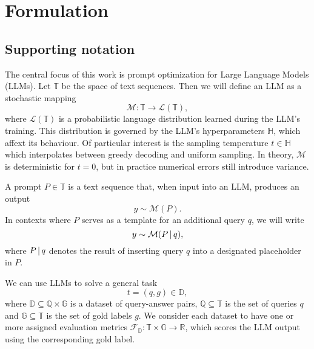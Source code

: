 \section{Formulation}\label{sec:notation}
\subsection{Supporting notation}
The central focus of this work is prompt optimization for Large Language Models (LLMs). 
Let $\mathbb{T}$ be the space of text sequences. Then we will define an LLM as a stochastic mapping
\begin{equation}
    \mathcal{M}: \mathbb{T} \rightarrow \mathcal{L}(\mathbb{T}),
\end{equation}
where $\mathcal{L}(\mathbb{T})$ is a probabilistic language distribution learned during the LLM's training.
This distribution is governed by the LLM's hyperparameters $\mathbb{H}$, which affext its behaviour. Of particular interest is
the sampling temperature $t \in \mathbb{H}$ which interpolates between greedy decoding and uniform sampling.
In theory, $\mathcal{M}$ is deterministic for $t=0$, but in practice numerical errors still introduce variance.

A prompt $P \in \mathbb{T}$ is a text sequence that, when input into an LLM, produces an output
\begin{equation}
    y \sim \mathcal{M}(P).
\end{equation}
In contexts where $P$ serves as a template for an additional query $q$, we will write
\begin{equation}
    y \sim \mathcal{M}(P\, \vert \, q),
\end{equation}
where $P \, \vert \, q$ denotes the result of inserting query $q$ into a designated placeholder in $P$.

We can use LLMs to solve a general task
\begin{equation}
    t = (q, g) \in \mathbb{D},
\end{equation}
where $\mathbb{D} \subseteq \mathbb{Q} \times \mathbb{G}$ is a dataset of query-answer pairs, $\mathbb{Q}\subseteq\mathbb{T}$ is the set of queries $q$
and $\mathbb{G}\subseteq\mathbb{T}$ is the set of gold labels $g$.
We consider each dataset to have one or more assigned evaluation metrics $\mathcal{F}_{\mathbb{D}}: \mathbb{T} \times \mathbb{G} \rightarrow \mathbb{R}$,
which scores the LLM output using the corresponding gold label. 

